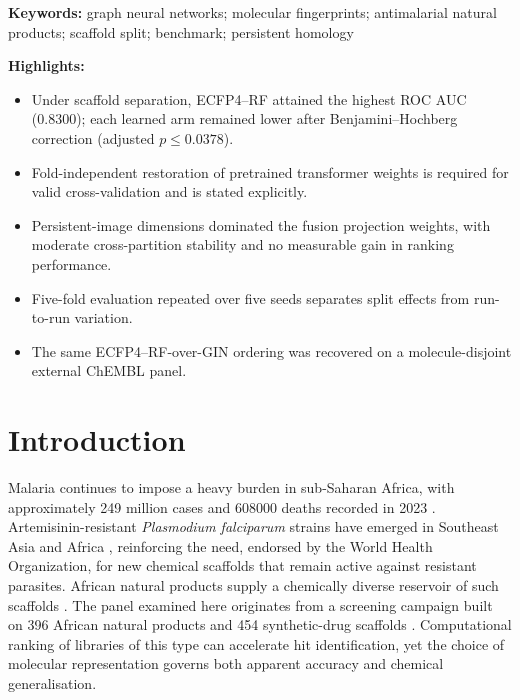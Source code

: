 \documentclass[11pt,a4paper]{article}
\begin{document}
\noindent\textbf{Keywords:} graph neural networks; molecular fingerprints; antimalarial natural products; scaffold split; benchmark; persistent homology

\noindent\textbf{Highlights:}
\begin{itemize}
\item Under scaffold separation, ECFP4--RF attained the highest ROC AUC (\num{0.8300}); each learned arm remained lower after Benjamini--Hochberg correction (adjusted $p \le \num{0.0378}$).
\item Fold-independent restoration of pretrained transformer weights is required for valid cross-validation and is stated explicitly.
\item Persistent-image dimensions dominated the fusion projection weights, with moderate cross-partition stability and no measurable gain in ranking performance.
\item Five-fold evaluation repeated over five seeds separates split effects from run-to-run variation.
\item The same ECFP4--RF-over-GIN ordering was recovered on a molecule-disjoint external ChEMBL panel.
\end{itemize}

\section{Introduction}

Malaria continues to impose a heavy burden in sub-Saharan Africa, with approximately \num{249} million cases and \num{608000} deaths recorded in \num{2023} \citep{who2024malariareport}. Artemisinin-resistant \emph{Plasmodium falciparum} strains have emerged in Southeast Asia and Africa \citep{ariyey2014,ashley2018}, reinforcing the need, endorsed by the World Health Organization, for new chemical scaffolds that remain active against resistant parasites. African natural products supply a chemically diverse reservoir of such scaffolds \citep{anpdb_2026,value_addition_african_np_2025}. The panel examined here originates from a screening campaign built on \num{396} African natural products and \num{454} synthetic-drug scaffolds \citep{temgoua2026antimalarial}. Computational ranking of libraries of this type can accelerate hit identification, yet the choice of molecular representation governs both apparent accuracy and chemical generalisation.
\end{document}
